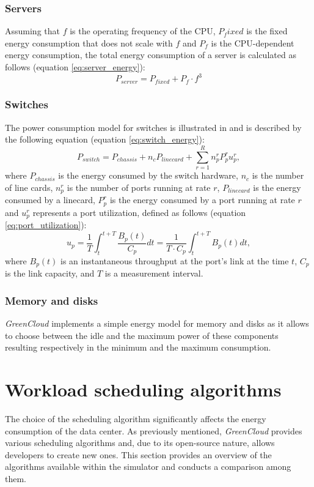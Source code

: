 \subsubsection{Servers}
Assuming that \(f\) is the operating frequency of the CPU, \(P_fixed\) is the fixed energy consumption that does not scale with \(f\) and \(P_f\) is the CPU-dependent energy consumption, the total energy consumption of a server is calculated as follows (equation \ref{eq:server_energy}):
\begin{equation} \label{eq:server_energy}
    P_{server} = P_{fixed} + P_f \cdot f^3
\end{equation}
\subsubsection{Switches}
The power consumption model for switches is illustrated in \cite{makaratzis2018energy} and is described by the following equation (equation \ref{eq:switch_energy}):
\begin{equation} \label{eq:switch_energy}
    P_{switch} = P_{chassis} + n_cP_{linecard} + \sum_{r=1}^{R} n^r_pP^r_pu^r_p,
\end{equation}
where \(P_{chassis}\) is the energy consumed by the switch hardware, \(n_c\) is the number of line cards, \(n_p^r\) is the number of ports running at rate \(r\),  \(P_{linecard}\) is the energy consumed by a linecard, \(P_p^r\) is the energy consumed by a port running at rate \(r\) and \(u_p^r\) represents a port utilization, defined as follows (equation \ref{eq:port_utilization}):
\begin{equation} \label{eq:port_utilization}
    u_p = \frac{1}{T} \int_{t}^{t+T} \frac{B_p(t)}{C_p} dt = \frac{1}{T\cdot C_p} \int_{t}^{t+T} B_p(t) dt,
\end{equation}
where \(B_p(t)\) is an instantaneous throughput at the port's link at the time \(t\), \(C_p\) is the link capacity, and \(T\) is a measurement interval. 
\subsubsection{Memory and disks}
\emph{GreenCloud} implements a simple energy model for memory and disks as it allows to choose between the idle and the maximum power of these components resulting respectively in the minimum and the maximum consumption. 

\section{Workload scheduling algorithms} 
The choice of the scheduling algorithm significantly affects the energy consumption of the data center. As previously mentioned, \emph{GreenCloud} provides various scheduling algorithms and, due to its open-source nature, allows developers to create new ones. This section provides an overview of the algorithms available within the simulator and conducts a comparison among them.

